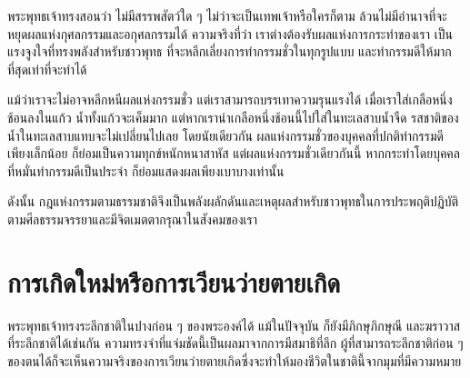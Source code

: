 \documentclass[12pt, openany]{book}
\begin{document}
พระพุทธเจ้า{\wbr}ทรง{\wbr}สอน{\wbr}ว่า ไม่{\wbr}มี{\wbr}สรรพ{\wbr}สัตว์{\wbr}ใด ๆ ไม่{\wbr}ว่า{\wbr}จะ{\wbr}เป็น{\wbr}เทพเจ้า{\wbr}หรือ{\wbr}ใคร{\wbr}ก็{\wbr}ตาม ล้วน{\wbr}ไม่{\wbr}มี{\wbr}อำนาจ{\wbr}ที่{\wbr}จะ{\wbr}หยุด{\wbr}ผล{\wbr}แห่ง{\wbr}กุศล{\wbr}กรรม{\wbr}และ{\wbr}อกุศล{\wbr}กรรม{\wbr}ได้  ความ{\wbr}จริง{\wbr}ที่{\wbr}ว่า เรา{\wbr}ต่าง{\wbr}ต้อง{\wbr}รับ{\wbr}ผล{\wbr}แห่ง{\wbr}การ{\wbr}กระทำ{\wbr}ของ{\wbr}เรา เป็น{\wbr}แรง{\wbr}จูง{\wbr}ใจ{\wbr}ที่{\wbr}ทรง{\wbr}พลัง{\wbr}สำหรับ{\wbr}ชาว{\wbr}พุทธ ที่{\wbr}จะ{\wbr}หลีก{\wbr}เลี่ยง{\wbr}การ{\wbr}ทำ{\wbr}กรรม{\wbr}ชั่ว{\wbr}ใน{\wbr}ทุก{\wbr}รูปแบบ และ{\wbr}ทำ{\wbr}กรรม{\wbr}ดี{\wbr}ให้{\wbr}มาก{\wbr}ที่สุด{\wbr}เท่า{\wbr}ที่{\wbr}จะ{\wbr}ทำ{\wbr}ได้{\wbr}

แม้{\wbr}ว่า{\wbr}เรา{\wbr}จะ{\wbr}ไม่{\wbr}อาจ{\wbr}หลีก{\wbr}หนี{\wbr}ผล{\wbr}แห่ง{\wbr}กรรม{\wbr}ชั่ว แต่{\wbr}เรา{\wbr}สามารถ{\wbr}บรรเทา{\wbr}ความ{\wbr}รุนแรง{\wbr}ได้  เมื่อ{\wbr}เรา{\wbr}ใส่{\wbr}เกลือ{\wbr}หนึ่ง{\wbr}ช้อน{\wbr}ลง{\wbr}ใน{\wbr}แก้ว น้ำ{\wbr}ทั้ง{\wbr}แก้ว{\wbr}จะ{\wbr}เค็ม{\wbr}มาก แต่{\wbr}หาก{\wbr}เรา{\wbr}นำ{\wbr}เกลือ{\wbr}หนึ่ง{\wbr}ช้อน{\wbr}นี้{\wbr}ไป{\wbr}ใส่{\wbr}ใน{\wbr}ทะเลสาบ{\wbr}น้ำ{\wbr}จืด รสชาติ{\wbr}ของ{\wbr}น้ำ{\wbr}ใน{\wbr}ทะเลสาบ{\wbr}แทบ{\wbr}จะ{\wbr}ไม่{\wbr}เปลี่ยน{\wbr}ไป{\wbr}เลย  โดย{\wbr}นัย{\wbr}เดียวกัน ผล{\wbr}แห่ง{\wbr}กรรม{\wbr}ชั่ว{\wbr}ของ{\wbr}บุคคล{\wbr}ที่{\wbr}ปกติ{\wbr}ทำ{\wbr}กรรม{\wbr}ดี{\wbr}เพียง{\wbr}เล็กน้อย ก็{\wbr}ย่อม{\wbr}เป็น{\wbr}ความ{\wbr}ทุกข์{\wbr}หนักหนา{\wbr}สาหัส แต่{\wbr}ผล{\wbr}แห่ง{\wbr}กรรม{\wbr}ชั่ว{\wbr}เดียวกัน{\wbr}นี้ หาก{\wbr}กระทำ{\wbr}โดย{\wbr}บุคคล{\wbr}ที่{\wbr}หมั่น{\wbr}ทำ{\wbr}กรรม{\wbr}ดี{\wbr}เป็น{\wbr}ประจำ ก็{\wbr}ย่อม{\wbr}แสดง{\wbr}ผล{\wbr}เพียง{\wbr}เบาบาง{\wbr}เท่านั้น 

ดังนั้น กฎ{\wbr}แห่ง{\wbr}กรรม{\wbr}ตาม{\wbr}ธรรมชาติ{\wbr}จึง{\wbr}เป็น{\wbr}พลัง{\wbr}ผลักดัน{\wbr}และ{\wbr}เหตุผล{\wbr}สำหรับ{\wbr}ชาว{\wbr}พุทธ{\wbr}ใน{\wbr}การ{\wbr}ประพฤติ{\wbr}ปฏิบัติ{\wbr}ตาม{\wbr}ศีลธรรม{\wbr}จรรยา{\wbr}และ{\wbr}มี{\wbr}จิต{\wbr}เมตตา{\wbr}กรุณา{\wbr}ใน{\wbr}สังคม{\wbr}ของ{\wbr}เรา 

\section{การ{\wbr}เกิด{\wbr}ใหม่{\wbr}หรือ{\wbr}การ{\wbr}เวียน{\wbr}ว่าย{\wbr}ตาย{\wbr}เกิด}


พระพุทธเจ้า{\wbr}ทรง{\wbr}ระลึก{\wbr}ชาติ{\wbr}ใน{\wbr}ปาง{\wbr}ก่อน ๆ ของ{\wbr}พระองค์{\wbr}ได้  แม้{\wbr}ใน{\wbr}ปัจจุบัน ก็{\wbr}ยัง{\wbr}มี{\wbr}ภิกษุ{\wbr}ภิกษุณี และ{\wbr}ฆราวาส{\wbr}ที่{\wbr}ระลึก{\wbr}ชาติ{\wbr}ได้{\wbr}เช่น{\wbr}กัน  ความ{\wbr}ทรง{\wbr}จำ{\wbr}ที่{\wbr}แจ่ม{\wbr}ชัด{\wbr}นี้{\wbr}เป็น{\wbr}ผล{\wbr}มา{\wbr}จาก{\wbr}การ{\wbr}มี{\wbr}สมาธิ{\wbr}ที่{\wbr}ลึก  ผู้{\wbr}ที่{\wbr}สามารถ{\wbr}ระลึก{\wbr}ชาติ{\wbr}ก่อน ๆ ของ{\wbr}ตน{\wbr}ได้{\wbr}ก็{\wbr}จะ{\wbr}เห็น{\wbr}ความ{\wbr}จริง{\wbr}ของ{\wbr}การ{\wbr}เวียน{\wbr}ว่าย{\wbr}ตาย{\wbr}เกิด{\wbr}ซึ่ง{\wbr}จะ{\wbr}ทำให้{\wbr}มอง{\wbr}ชีวิต{\wbr}ใน{\wbr}ชาติ{\wbr}นี้{\wbr}จาก{\wbr}มุม{\wbr}ที่{\wbr}มี{\wbr}ความหมาย  
\end{document}
